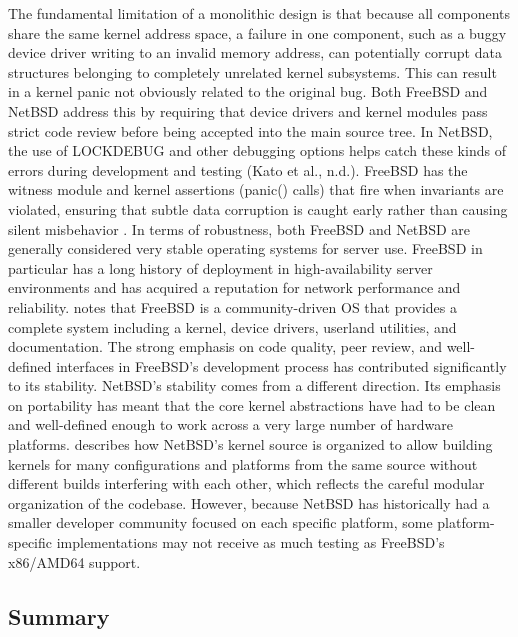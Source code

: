 The fundamental limitation of a monolithic design is that because all components share the same kernel address space, a failure in one component, such as a buggy device driver writing to an invalid memory address, can potentially corrupt data structures belonging to completely unrelated kernel subsystems. This can result in a kernel panic not obviously related to the original bug. Both FreeBSD and NetBSD address this by requiring that device drivers and kernel modules pass strict code review before being accepted into the main source tree.
In NetBSD, the use of LOCKDEBUG and other debugging options helps catch these kinds of errors during development and testing (Kato et al., n.d.). FreeBSD has the witness module and kernel assertions (panic() calls) that fire when invariants are violated, ensuring that subtle data corruption is caught early rather than causing silent misbehavior \parencite{watson2015}.
In terms of robustness, both FreeBSD and NetBSD are generally considered very stable operating systems for server use. FreeBSD in particular has a long history of deployment in high-availability server environments and has acquired a reputation for network performance and reliability. \textcite{conclusive24} notes that FreeBSD is a community-driven OS that provides a complete system including a kernel, device drivers, userland utilities, and documentation. The strong emphasis on code quality, peer review, and well-defined interfaces in FreeBSD's development process has contributed significantly to its stability.
NetBSD's stability comes from a different direction. Its emphasis on portability has meant that the core kernel abstractions have had to be clean and well-defined enough to work across a very large number of hardware platforms. \textcite{feyrer2002} describes how NetBSD's kernel source is organized to allow building kernels for many configurations and platforms from the same source without different builds interfering with each other, which reflects the careful modular organization of the codebase. However, because NetBSD has historically had a smaller developer community focused on each specific platform, some platform-specific implementations may not receive as much testing as FreeBSD's x86/AMD64 support.


\subsection{Summary}

